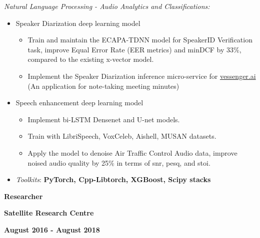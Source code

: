 \documentclass[10pt]{article}
\begin{document}
        \emph{Natural Language Processing - Audio Analytics and Classifications:}
        \vspace{-2.5mm}
        \begin{itemize}[noitemsep]
            \item Speaker Diarization deep learning model
                \begin{itemize}[noitemsep]
                    \item Train and maintain the ECAPA-TDNN model for SpeakerID Verification task, improve Equal Error Rate (EER metrics) and minDCF by 33\%, compared to the existing x-vector model.
                    \item Implement the Speaker Diarization inference micro-service for \href{http://vessenger.ai/}{vessenger.ai} (An application for note-taking meeting minutes)
                \end{itemize}
            \item Speech enhancement deep learning model
                \begin{itemize}[noitemsep]
                    \item Implement bi-LSTM Densenet and U-net models.
                    \item Train with LibriSpeech, VoxCeleb, Aishell, MUSAN datasets.
                    \item Apply the model to denoise Air Traffic Control Audio data, improve noised audio quality by 25\% in terms of snr, pesq, and stoi.
                \end{itemize}
            \item \emph{Toolkits}: \textbf{PyTorch, Cpp-Libtorch, XGBoost, Scipy stacks}
        \end{itemize}

        \begin{multicols}{3}
            \begin{flushleft}
                \textbf{Researcher}
            \end{flushleft}

            \columnbreak

            \begin{center}
                \textbf{Satellite Research Centre}
            \end{center}

            \columnbreak

            \begin{flushright}
                \textbf{August 2016 - August 2018}
            \end{flushright}
        \end{multicols}
\end{document}
